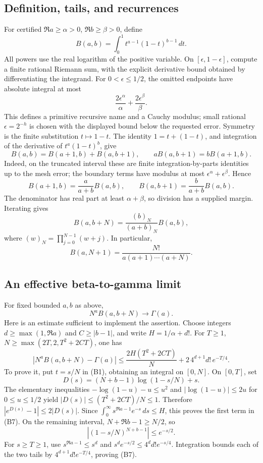 \subsection{Definition, tails, and recurrences}

For certified \(\Re a\ge\alpha>0\), \(\Re b\ge\beta>0\), define
\[
 B(a,b)=\int_0^1t^{a-1}(1-t)^{b-1}\,dt.                 \tag{B1}
\]
All powers use the real logarithm of the positive variable. On
\([\epsilon,1-\epsilon]\), compute a finite rational Riemann sum,
with the explicit derivative bound obtained by differentiating the
integrand. For \(0<\epsilon\le1/2\), the omitted endpoints have
absolute integral at most
\[
 \frac{2\epsilon^\alpha}{\alpha}
       +\frac{2\epsilon^\beta}{\beta}.                  \tag{B2}
\]
This defines a primitive recursive name and a Cauchy modulus; small
rational \(\epsilon=2^{-h}\) is chosen with the displayed bound below
the requested error. Symmetry is the finite substitution \(t\mapsto1-t\).
The identity \(1=t+(1-t)\), and integration of the derivative of
\(t^a(1-t)^b\), give
\[
 B(a,b)=B(a+1,b)+B(a,b+1),\qquad
 aB(a,b+1)=bB(a+1,b).
\]
Indeed, on the truncated interval these are finite integration-by-parts
identities up to the mesh error; the boundary terms have modulus at most
\(\epsilon^\alpha+\epsilon^\beta\). Hence
\[
 B(a+1,b)=\frac a{a+b}B(a,b),\qquad
 B(a,b+1)=\frac b{a+b}B(a,b).                            \tag{B3}
\]
The denominator has real part at least \(\alpha+\beta\), so division
has a supplied margin. Iterating gives
\[
 B(a,b+N)=\frac{(b)_N}{(a+b)_N}B(a,b),                  \tag{B4}
\]
where \((w)_N=\prod_{j=0}^{N-1}(w+j)\). In particular,
\[
 B(a,N+1)=\frac{N!}{a(a+1)\cdots(a+N)}.                \tag{B5}
\]

\subsection{An effective beta-to-gamma limit}

For fixed bounded \(a,b\) as above,
\[
 N^aB(a,b+N)\longrightarrow\Gamma(a).                   \tag{B6}
\]
Here is an estimate sufficient to implement the assertion. Choose
integers \(d\ge\max(1,\Re a)\) and \(C\ge|b-1|\), and write
\(H=1/\alpha+d!\). For \(T\ge1\),
\(N\ge\max(2T,2,T^2+2CT)\), one has
\[
 |N^aB(a,b+N)-\Gamma(a)|
 \le \frac{2H(T^2+2CT)}N
         +2\,4^{d+1}d!\,e^{-T/4}.                     \tag{B7}
\]
To prove it, put \(t=s/N\) in (B1), obtaining an integral on
\([0,N]\). On \([0,T]\), set
\[
 D(s)=(N+b-1)\log(1-s/N)+s.
\]
The elementary inequalities
\(-\log(1-u)-u\le u^2\) and \(|\log(1-u)|\le2u\) for
\(0\le u\le1/2\) yield
\(|D(s)|\le(T^2+2CT)/N\le1\). Therefore
\(|e^{D(s)}-1|\le2|D(s)|\). Since
\(\int_0^\infty s^{\Re a-1}e^{-s}\,ds\le H\), this proves the first
term in (B7). On the remaining interval, \(N+\Re b-1\ge N/2\), so
\[
 |(1-s/N)^{N+b-1}|\le e^{-s/2}.
\]
For \(s\ge T\ge1\), use
\(s^{\Re a-1}\le s^d\) and
\(s^de^{-s/2}\le4^dd!e^{-s/4}\). Integration bounds each of the two
tails by \(4^{d+1}d!e^{-T/4}\), proving (B7).

